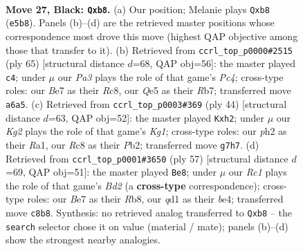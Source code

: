 \documentclass[11pt]{article}
\begin{document}
\clearpage

\begin{figure}[p]\centering
\begin{subfigure}{0.46\textwidth}\centering
\resizebox{\linewidth}{!}{%
\newchessgame
\chessboard[
  setfen={1Nr5/rp2bpk1/pB2p3/4q3/7p/4PP2/PP4PP/R2QR1K1 b - - 2 27},
  showmover=false,
  pgfstyle=straightmove, color=movearrow, markmove={e5-b8}
]}
\caption{}
\end{subfigure}\hfill
\begin{subfigure}{0.46\textwidth}\centering
\resizebox{\linewidth}{!}{%
\newchessgame
\chessboard[
  setfen={2r3k1/pr4pp/8/1PpPq3/P2pN3/4bPP1/7P/1R1QR2K b - - 0 33},
  showmover=false,
  pgfstyle=straightmove, color=movearrow, markmove={c5-c4}
]}
\caption{}
\end{subfigure}
\\[4pt]
\begin{subfigure}{0.46\textwidth}\centering
\resizebox{\linewidth}{!}{%
\newchessgame
\chessboard[
  setfen={2q1r1k1/5p1p/r1p3p1/p1P5/Q2p4/7P/PP1BRPPb/R5K1 w - - 4 23},
  showmover=false,
  pgfstyle=straightmove, color=movearrow, markmove={g1-h2}
]}
\caption{}
\end{subfigure}\hfill
\begin{subfigure}{0.46\textwidth}\centering
\resizebox{\linewidth}{!}{%
\newchessgame
\chessboard[
  setfen={1r4k1/3b2p1/4p2p/8/p2PBr1q/4Q3/PPR2P1P/4R1K1 b - - 1 29},
  showmover=false,
  pgfstyle=straightmove, color=movearrow, markmove={d7-e8}
]}
\caption{}
\end{subfigure}
\caption{\textbf{Move 27, Black: \texttt{Qxb8}.} (a) Our position; Melanie plays \texttt{Qxb8} (\texttt{e5b8}). Panels (b)--(d) are the retrieved master positions whose correspondence most drove this move (highest QAP objective among those that transfer to it). (b) Retrieved from \texttt{ccrl\_top\_p0000\#2515} (ply 65) [structural distance $d$=68, QAP obj=56]: the master played \texttt{c4}; under $\mu$ our \emph{Pa3} plays the role of that game's \emph{Pc4}; cross-type roles: our \emph{B}e7 as their \emph{R}c8, our \emph{Q}e5 as their \emph{R}b7; transferred move \texttt{a6a5}. (c) Retrieved from \texttt{ccrl\_top\_p0003\#369} (ply 44) [structural distance $d$=63, QAP obj=52]: the master played \texttt{Kxh2}; under $\mu$ our \emph{Kg2} plays the role of that game's \emph{Kg1}; cross-type roles: our \emph{p}h2 as their \emph{R}a1, our \emph{R}c8 as their \emph{P}b2; transferred move \texttt{g7h7}. (d) Retrieved from \texttt{ccrl\_top\_p0001\#3650} (ply 57) [structural distance $d$=69, QAP obj=51]: the master played \texttt{Be8}; under $\mu$ our \emph{Rc1} plays the role of that game's \emph{Bd2} (a \textbf{cross-type} correspondence); cross-type roles: our \emph{B}e7 as their \emph{R}b8, our \emph{q}d1 as their \emph{b}e4; transferred move \texttt{c8b8}. Synthesis: no retrieved analog transferred to \texttt{Qxb8} -- the \texttt{search} selector chose it on value (material / mate); panels (b)--(d) show the strongest nearby analogies.}
\label{fig:thought-m53}
\end{figure}
\end{document}
